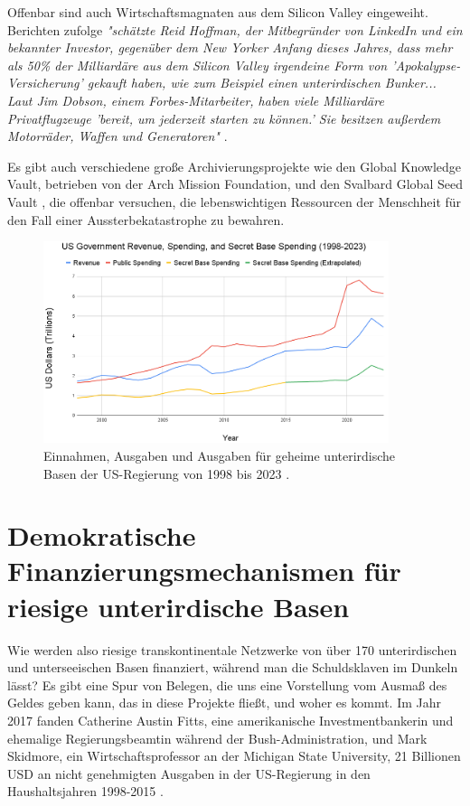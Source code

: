 \documentclass[10pt,twocolumn,letterpaper]{article}
\begin{document}
Offenbar sind auch Wirtschaftsmagnaten aus dem Silicon Valley eingeweiht. Berichten zufolge \textit{"schätzte Reid Hoffman, der Mitbegründer von LinkedIn und ein bekannter Investor, gegenüber dem New Yorker Anfang dieses Jahres, dass mehr als 50\% der Milliardäre aus dem Silicon Valley irgendeine Form von 'Apokalypse-Versicherung' gekauft haben, wie zum Beispiel einen unterirdischen Bunker... Laut Jim Dobson, einem Forbes-Mitarbeiter, haben viele Milliardäre Privatflugzeuge 'bereit, um jederzeit starten zu können.' Sie besitzen außerdem Motorräder, Waffen und Generatoren"} \cite{28}.

Es gibt auch verschiedene große Archivierungsprojekte wie den Global Knowledge Vault, betrieben von der Arch Mission Foundation, \cite{29} und den Svalbard Global Seed Vault \cite{30}, die offenbar versuchen, die lebenswichtigen Ressourcen der Menschheit für den Fall einer Aussterbekatastrophe zu bewahren.

\begin{figure}[t]
\begin{center}
\includegraphics[width=0.9\textwidth]{govcrop2.png}
\end{center}
   \caption{Einnahmen, Ausgaben und Ausgaben für geheime unterirdische Basen der US-Regierung von 1998 bis 2023 \cite{19}.}
   \label{fig:9}
\end{figure}
\section{Demokratische Finanzierungsmechanismen für riesige unterirdische Basen}

Wie werden also riesige transkontinentale Netzwerke von über 170 unterirdischen und unterseeischen Basen finanziert, während man die Schuldsklaven im Dunkeln lässt? Es gibt eine Spur von Belegen, die uns eine Vorstellung vom Ausmaß des Geldes geben kann, das in diese Projekte fließt, und woher es kommt. Im Jahr 2017 fanden Catherine Austin Fitts, eine amerikanische Investmentbankerin und ehemalige Regierungsbeamtin während der Bush-Administration, und Mark Skidmore, ein Wirtschaftsprofessor an der Michigan State University, 21 Billionen USD an nicht genehmigten Ausgaben in der US-Regierung in den Haushaltsjahren 1998-2015 \cite{11,12,13}.
\end{document}
